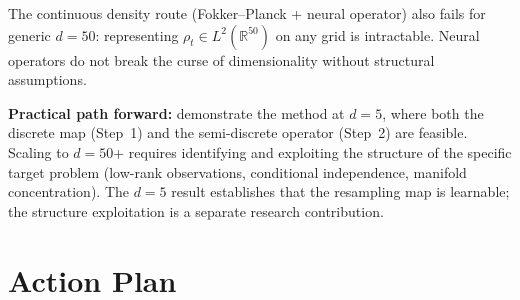 \documentclass[11pt]{article}
\newcommand{\RR}{\mathbb{R}}
\begin{document}
The continuous density route (Fokker--Planck + neural operator) also fails for generic $d = 50$: representing $\rho_t \in L^2(\RR^{50})$ on any grid is intractable. Neural operators do not break the curse of dimensionality without structural assumptions.

\textbf{Practical path forward:} demonstrate the method at $d = 5$, where both the discrete map (Step~1) and the semi-discrete operator (Step~2) are feasible. Scaling to $d = 50$+ requires identifying and exploiting the structure of the specific target problem (low-rank observations, conditional independence, manifold concentration). The $d = 5$ result establishes that the resampling map is learnable; the structure exploitation is a separate research contribution.

\section{Action Plan}
\end{document}
